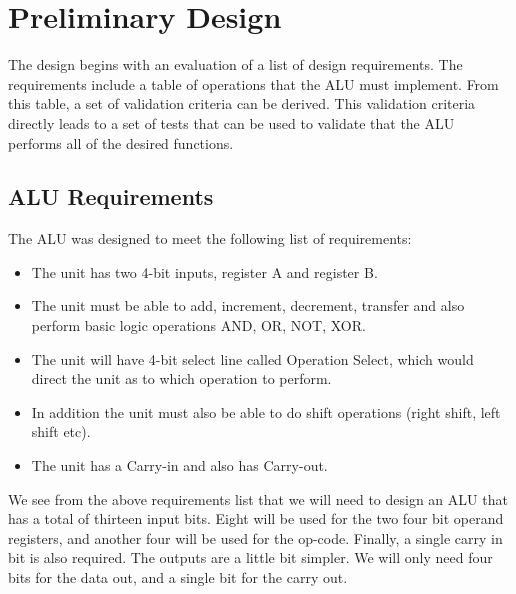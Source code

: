 \documentclass{article}
\begin{document}

\section{Preliminary Design}
The design begins with an evaluation of a list of design requirements. The requirements include a table
of operations that the ALU must implement. From this table, a set of validation criteria
can be derived. This validation criteria directly leads to a set of tests that can be used 
to validate that the ALU performs all of the desired functions.


\subsection{ALU Requirements}
The ALU was designed to meet the following list of requirements:

\begin{itemize}
   \item The unit has two 4-bit inputs, register A and register B. 
   \item The unit must be able to add, increment, decrement, transfer and also perform basic logic operations AND, OR, NOT, XOR. 
   \item The unit will have 4-bit select line called Operation Select, which would direct the unit as to which operation to perform. 
   \item In addition the unit must also be able to do shift operations (right shift, left shift etc). 
   \item The unit has a Carry-in and also has Carry-out. 
\end{itemize}

We see from the above requirements list that we will need to design an ALU that has a total of thirteen
input bits. Eight will be used for the two four bit operand registers, and another four will be used for
the op-code. Finally, a single carry in bit is also required. The outputs are a little bit simpler. We will only need four bits for the data out, and a single bit for the carry out.

\newpage
\end{document}
